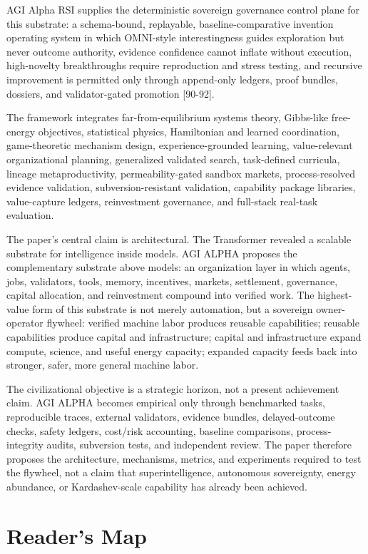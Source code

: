 \documentclass[
  11pt,
]{article}
\begin{document}
AGI Alpha RSI supplies the deterministic sovereign governance control
plane for this substrate: a schema-bound, replayable,
baseline-comparative invention operating system in which OMNI-style
interestingness guides exploration but never outcome authority, evidence
confidence cannot inflate without execution, high-novelty breakthroughs
require reproduction and stress testing, and recursive improvement is
permitted only through append-only ledgers, proof bundles, dossiers, and
validator-gated promotion {[}90-92{]}.

The framework integrates far-from-equilibrium systems theory, Gibbs-like
free-energy objectives, statistical physics, Hamiltonian and learned
coordination, game-theoretic mechanism design, experience-grounded
learning, value-relevant organizational planning, generalized validated
search, task-defined curricula, lineage metaproductivity,
permeability-gated sandbox markets, process-resolved evidence
validation, subversion-resistant validation, capability package
libraries, value-capture ledgers, reinvestment governance, and
full-stack real-task evaluation.

The paper's central claim is architectural. The Transformer revealed a
scalable substrate for intelligence inside models. AGI ALPHA proposes
the complementary substrate above models: an organization layer in which
agents, jobs, validators, tools, memory, incentives, markets,
settlement, governance, capital allocation, and reinvestment compound
into verified work. The highest-value form of this substrate is not
merely automation, but a sovereign owner-operator flywheel: verified
machine labor produces reusable capabilities; reusable capabilities
produce capital and infrastructure; capital and infrastructure expand
compute, science, and useful energy capacity; expanded capacity feeds
back into stronger, safer, more general machine labor.

The civilizational objective is a strategic horizon, not a present
achievement claim. AGI ALPHA becomes empirical only through benchmarked
tasks, reproducible traces, external validators, evidence bundles,
delayed-outcome checks, safety ledgers, cost/risk accounting, baseline
comparisons, process-integrity audits, subversion tests, and independent
review. The paper therefore proposes the architecture, mechanisms,
metrics, and experiments required to test the flywheel, not a claim that
superintelligence, autonomous sovereignty, energy abundance, or
Kardashev-scale capability has already been achieved.

\section{Reader's Map}\label{readers-map}
\end{document}
